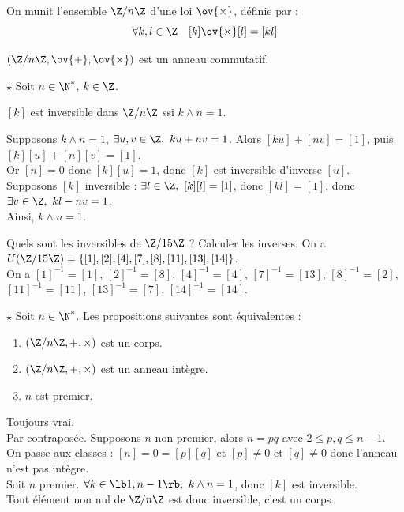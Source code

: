\documentclass[11pt]{article}
\begin{document}
\begin{defi}{}{}
    On munit l'ensemble $\Z/n\Z$ d'une loi $\ov{\times}$, définie par :
    \begin{equation*}
        \forall k,l \in \Z \quad [k]\ov{\times}[l]=[kl]
    \end{equation*} 
\end{defi}

\vspace*{-0.4cm}

\begin{thm}{}{}
    $(\Z/n\Z,\ov{+},\ov{\times})$ est un anneau commutatif.
\end{thm}

\vspace*{-0.4cm}

\begin{thm}{$\star$}{}
    Soit $n\in\N^*$, $k\in\Z$.
    \begin{center}
        $[k]$ est inversible dans $\Z/n\Z$ ssi $k\land n = 1$.
    \end{center}
    \tcblower
    \boxed{\ra} Supposons $k\land n = 1$, $\exists u,v \in \Z, ~ ku+nv=1$. Alors $[ku]+[nv]=[1]$, puis $[k][u]+[n][v]=[1]$.\\
    Or $[n]=0$ donc $[k][u]=1$, donc $[k]$ est inversible d'inverse $[u]$.\\
    \boxed{\la} Supposons $[k]$ inversible : $\exists l \in \Z, ~ [k][l]=[1]$, donc $[kl]=[1]$, donc $\exists v \in \Z, ~ kl-nv=1$.\\
    Ainsi, $k\land n = 1$.
\end{thm}

\begin{ex}{}{}
    Quels sont les inversibles de $\Z/15\Z$ ? Calculer les inverses.
    \tcblower
    On a $U(\Z/15\Z)=\{[1],[2],[4],[7],[8],[11],[13],[14]\}$.\\
    On a $[1]^{-1}=[1]$, $[2]^{-1}=[8]$, $[4]^{-1}=[4]$, $[7]^{-1}=[13]$, $[8]^{-1}=[2]$, $[11]^{-1}=[11]$, $[13]^{-1}=[7]$, $[14]^{-1}=[14]$.
\end{ex}

\begin{prop}{$\star$}{}
    Soit $n\in\N^*$. Les propositions suivantes sont équivalentes :
    \begin{enumerate}
        \item $(\Z/n\Z,+,\times)$ est un corps.
        \item $(\Z/n\Z,+,\times)$ est un anneau intègre.
        \item $n$ est premier. 
    \end{enumerate}
    \tcblower
     Toujours vrai.\\
     Par contraposée. Supposons $n$ non premier, alors $n=pq$ avec $2\leq p,q \leq n-1$.\\
    On passe aux classes : $[n]=0=[p][q]$ et $[p]\neq0$ et $[q]\neq0$ donc l'anneau n'est pas intègre. \\
     Soit $n$ premier. $\forall k \in \lb1,n-1\rb, ~ k \land n = 1$, donc $[k]$ est inversible.\\
    Tout élément non nul de $\Z/n\Z$ est donc inversible, c'est un corps.
\end{prop}
\end{document}
